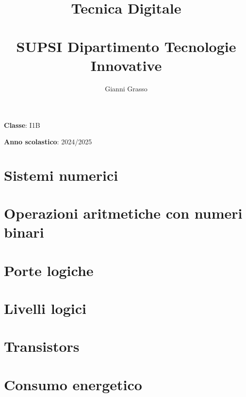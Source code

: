 \documentclass{article}
\title{
    Tecnica Digitale \\
    \phantom{}\\
    \large SUPSI Dipartimento Tecnologie Innovative
}
\author{Gianni Grasso}
\begin{document}
\maketitle
\hphantom{ }
\vspace{14.5cm}

\textbf{Classe}: I1B

\textbf{Anno scolastico}: 2024/2025
\pagebreak


\tableofcontents
\pagebreak

\section{Sistemi numerici}

\pagebreak

\section{Operazioni aritmetiche con numeri binari}

\pagebreak

\section{Porte logiche}

\pagebreak

\section{Livelli logici}

\pagebreak

\section{Transistors}

\pagebreak

\section{Consumo energetico}

\pagebreak
\end{document}
